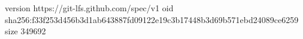 version https://git-lfs.github.com/spec/v1
oid sha256:f33f253d456b3d1ab643887fd09122e19c3b17448b3d69b571ebd24089ce6259
size 349692
